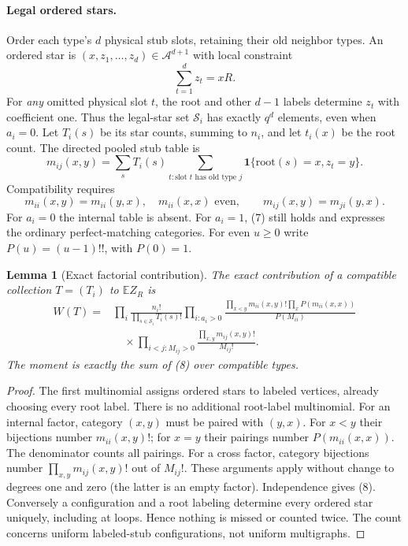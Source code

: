 \documentclass[11pt]{article}
\newtheorem{lemma}{Lemma}
\newcommand{\E}{\mathbb E}
\begin{document}
\paragraph{Legal ordered stars.}
Order each type's $d$ physical stub slots, retaining their old neighbor
types. An ordered star is $(x,z_1,\ldots,z_d)\in\mathcal A^{d+1}$
with local constraint
\[
 \sum_{t=1}^d z_t=xR.                              \tag{5}
\]
For \emph{any} omitted physical slot $t$, the root and other $d-1$
labels determine $z_t$ with coefficient one. Thus the legal-star set
$\mathcal S_i$ has exactly $q^d$ elements, even when $a_i=0$.
Let $T_i(s)$ be its star counts, summing to $n_i$, and let $t_i(x)$ be
the root count. The directed pooled stub table is
\[
 m_{ij}(x,y)=\sum_sT_i(s)
   \sum_{t:\text{slot }t\text{ has old type }j}
        \boldsymbol1\{\text{root}(s)=x,z_t=y\}.     \tag{6}
\]
Compatibility requires
\[
 m_{ii}(x,y)=m_{ii}(y,x),\quad m_{ii}(x,x)\text{ even},\qquad
 m_{ij}(x,y)=m_{ji}(y,x).                           \tag{7}
\]
For $a_i=0$ the internal table is absent. For $a_i=1$, (7) still holds
and expresses the ordinary perfect-matching categories.
For even $u\geq0$ write $P(u)=(u-1)!!$, with $P(0)=1$.

\begin{lemma}[Exact factorial contribution]
The exact contribution of a compatible collection $T=(T_i)$ to
$\E Z_R$ is
\begin{align}
 W(T)={}&\prod_i\frac{n_i!}{\prod_{s\in\mathcal S_i}T_i(s)!}
 \prod_{i:a_i>0}
 \frac{\prod_{x<y}m_{ii}(x,y)!\prod_xP(m_{ii}(x,x))}{P(M_{ii})}
 \nonumber\\
 &\quad\times\prod_{i<j:M_{ij}>0}
       \frac{\prod_{x,y}m_{ij}(x,y)!}{M_{ij}!}.
 \tag{8}
\end{align}
The moment is exactly the sum of (8) over compatible types.
\end{lemma}
\begin{proof}
The first multinomial assigns ordered stars to labeled vertices, already
choosing every root label. There is no additional root-label multinomial.
For an internal factor, category $(x,y)$ must be paired with $(y,x)$.
For $x<y$ their bijections number $m_{ii}(x,y)!$; for $x=y$ their
pairings number $P(m_{ii}(x,x))$. The denominator counts all pairings.
For a cross factor, category bijections number $\prod_{x,y}m_{ij}(x,y)!$
out of $M_{ij}!$. These arguments apply without change to degrees one
and zero (the latter is an empty factor). Independence gives (8).
Conversely a configuration and a root labeling determine every ordered
star uniquely, including at loops. Hence nothing is missed or counted
twice. The count concerns uniform labeled-stub configurations, not
uniform multigraphs.
\end{proof}
\end{document}
